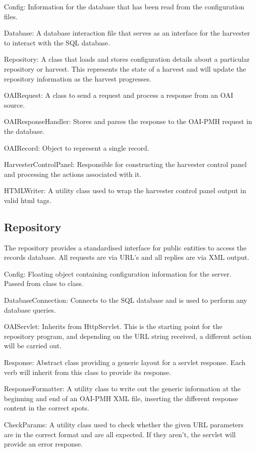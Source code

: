 \documentclass[a4paper,11pt]{article}
\begin{document}
Config: Information for the database that has been read from the configuration files.

Database: A database interaction file that serves as an interface for the harvester to interact with the SQL database.

Repository: A class that loads and stores configuration details about a particular repository or harvest. This represents the state of a harvest and will update the repository information as the harvest progresses.

OAIRequest: A class to send a request and process a response from an OAI source.

OAIResponseHandler: Stores and parses the response to the OAI-PMH request in the database.

OAIRecord: Object to represent a single record.

HarvesterControlPanel: Responsible for constructing the harvester control panel and processing the actions associated with it.

HTMLWriter: A utility class used to wrap the harvester control panel output in valid html tags.

\subsection{Repository}

The repository provides a standardised interface for public entities to access the records database. All requests are via URL's and all replies are via XML output.

Config: Floating object containing configuration information for the server. Passed from class to class.

DatabaseConnection: Connects to the SQL database and is used to perform any database queries.

OAIServlet: Inherits from HttpServlet. This is the starting point for the repository program, and depending on the URL string received, a different action will be carried out.

Response: Abstract class providing a generic layout for a servlet response. Each verb will inherit from this class to provide its response.

ResponseFormatter: A utility class to write out the generic information at the beginning and end of an OAI-PMH XML file, inserting the different response content in the correct spots.

CheckParams: A utility class used to check whether the given URL parameters are in the correct format and are all expected. If they aren't, the servlet will provide an error response.
\end{document}
